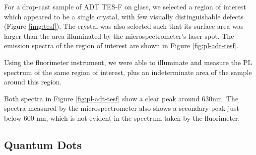 For a drop-cast sample of ADT TES-F on glass, we selected a region of interest which appeared to be a single crystal, with few visually distinguishable defects (Figure \ref{img:tesf}). The crystal was also selected such that its surface area was larger than the area illuminated by the microspectrometer's laser spot. The emission spectra of the region of interest are shown in Figure \ref{fig:pl-adt-tesf}.

Using the fluorimeter instrument, we were able to illuminate and measure the PL spectrum of the same region of interest, plus an indeterminate area of the sample around this region.

Both spectra in Figure \ref{fig:pl-adt-tesf} show a clear peak around 630nm. The spectra measured by the microspectrometer also shows a secondary peak just below 600 nm, which is not evident in the spectrum taken by the fluorimeter. \cite{lam_polarization_2018}\cite{ostroverkhova_organic_2016}\cite{platt_optical_2009}


\subsection{ Quantum Dots}

